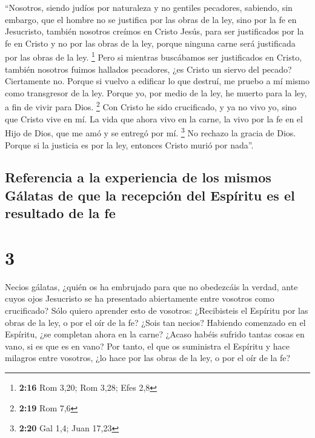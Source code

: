  ``Nosotros, siendo judíos por naturaleza y no gentiles
pecadores,  sabiendo, sin embargo, que el hombre no se
justifica por las obras de la ley, sino por la fe en Jesucristo, también
nosotros creímos en Cristo Jesús, para ser justificados por la fe en
Cristo y no por las obras de la ley, porque ninguna carne será
justificada por las obras de la ley. \footnote{\textbf{2:16} Rom 3,20;
  Rom 3,28; Efes 2,8}  Pero si mientras buscábamos ser
justificados en Cristo, también nosotros fuimos hallados pecadores, ¿es
Cristo un siervo del pecado? Ciertamente no.  Porque si
vuelvo a edificar lo que destruí, me pruebo a mí mismo como transgresor
de la ley.  Porque yo, por medio de la ley, he muerto
para la ley, a fin de vivir para Dios. \footnote{\textbf{2:19} Rom 7,6}
 Con Cristo he sido crucificado, y ya no vivo yo, sino
que Cristo vive en mí. La vida que ahora vivo en la carne, la vivo por
la fe en el Hijo de Dios, que me amó y se entregó por mí. \footnote{\textbf{2:20}
  Gal 1,4; Juan 17,23}  No rechazo la gracia de Dios.
Porque si la justicia es por la ley, entonces Cristo murió por nada''.

\hypertarget{referencia-a-la-experiencia-de-los-mismos-guxe1latas-de-que-la-recepciuxf3n-del-espuxedritu-es-el-resultado-de-la-fe}{%
\subsection{Referencia a la experiencia de los mismos Gálatas de que la
recepción del Espíritu es el resultado de la
fe}\label{referencia-a-la-experiencia-de-los-mismos-guxe1latas-de-que-la-recepciuxf3n-del-espuxedritu-es-el-resultado-de-la-fe}}

\hypertarget{section-2}{%
\section{3}\label{section-2}}

 Necios gálatas, ¿quién os ha embrujado para que no
obedezcáis la verdad, ante cuyos ojos Jesucristo se ha presentado
abiertamente entre vosotros como crucificado?  Sólo quiero
aprender esto de vosotros: ¿Recibisteis el Espíritu por las obras de la
ley, o por el oír de la fe?  ¿Sois tan necios? Habiendo
comenzado en el Espíritu, ¿se completan ahora en la carne?
 ¿Acaso habéis sufrido tantas cosas en vano, si es que es
en vano?  Por tanto, el que os suministra el Espíritu y
hace milagros entre vosotros, ¿lo hace por las obras de la ley, o por el
oír de la fe?

